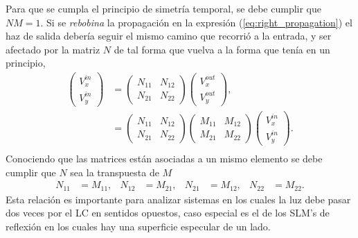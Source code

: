 \begin{enumerate}
Para que se cumpla el principio de simetría temporal, se debe cumplir
que $NM=1$. Si se \textit{rebobina} la propagación en la expresión
(\ref{eq:right_propagation}) el haz de salida 
debería seguir el mismo camino que recorrió a la entrada, y ser
afectado por la matriz $N$ de tal forma que vuelva a la forma que
tenía en un principio,
 \begin{align*}
    \begin{pmatrix}
      V_x^{in}\\V_y^{in}
    \end{pmatrix}
    &=
    \begin{pmatrix}
      N_{11}&N_{12}\\N_{21} & N_{22}
    \end{pmatrix}
    \begin{pmatrix}
      V_x^{out}\\V_y^{out}
    \end{pmatrix},\\
    &=
    \begin{pmatrix}
      N_{11}&N_{12}\\N_{21} & N_{22}
    \end{pmatrix}
    \begin{pmatrix}
      M_{11}&M_{12}\\M_{21} & M_{22}
    \end{pmatrix}
    \begin{pmatrix}
      V_x^{in}\\V_y^{in}
    \end{pmatrix}.\\
  \end{align*}
  Conociendo que las matrices están asociadas a un mismo elemento se
  debe cumplir que $N$ sea la transpuesta de $M$
  \begin{align*}
    N_{11}&=M_{11},&    N_{12}&=M_{21},&     N_{21}&=M_{12}, &     N_{22}&=M_{22}.
  \end{align*}
Esta relación es importante para analizar sistemas en los cuales la
luz debe pasar dos veces por el LC en sentidos opuestos, caso especial
es el de los SLM's de reflexión en los cuales hay una
superficie especular de un lado.


\end{enumerate}
